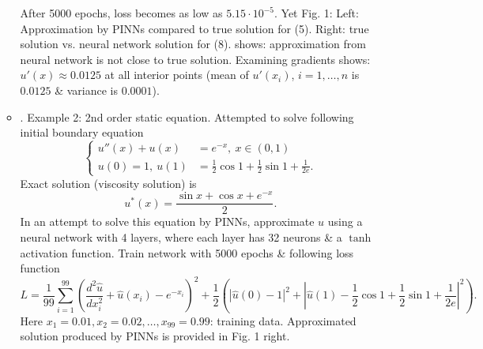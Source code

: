 \documentclass{article}
\begin{document}
\begin{itemize}
\begin{itemize}
		After 5000 epochs, loss becomes as low as $5.15\cdot10^{-5}$. Yet {\sf Fig. 1: Left: Approximation by PINNs compared to true solution for (5). Right: true solution vs. neural network solution for (8).} shows: approximation from neural network is not close to true solution. Examining gradients shows: $u'(x)\approx0.0125$ at all interior points (mean of $u'(x_i)$, $i = 1,\ldots,n$ is $0.0125$ \& variance is $0.0001$).
		\item {. Example 2: 2nd order static equation.} Attempted to solve following initial boundary equation
		\begin{equation*}
			\left\{\begin{split}
				u''(x) + u(x) &= e^{-x},\ x\in(0,1)\\
				u(0) = 1,\ u(1) &= \frac{1}{2}\cos1 + \frac{1}{2}\sin1 + \frac{1}{2e}.
			\end{split}\right.
		\end{equation*}
		Exact solution (viscosity solution) is
		\begin{equation*}
			u^*(x) = \frac{\sin x + \cos x + e^{-x}}{2}.
		\end{equation*}
		In an attempt to solve this equation by PINNs, approximate $u$ using a neural network with 4 layers, where each layer has 32 neurons \& a $\tanh$ activation function. Train network with 5000 epochs \& following loss function
		\begin{equation*}
			L = \frac{1}{99}\sum_{i=1}^{99} \left(\frac{d^2\hat{u}}{dx_i^2} + \hat{u}(x_i) - e^{-x_i}\right)^2 + \frac{1}{2}\left(|\hat{u}(0) - 1|^2 + \left|\hat{u}(1) - \frac{1}{2}\cos1 + \frac{1}{2}\sin1 + \frac{1}{2e}\right|^2\right).
		\end{equation*}
		Here $x_1 = 0.01,x_2 = 0.02,\ldots,x_{99} = 0.99$: training data. Approximated solution produced by PINNs is provided in {\sf Fig. 1 right}.


\end{itemize}
\end{itemize}
\end{document}
